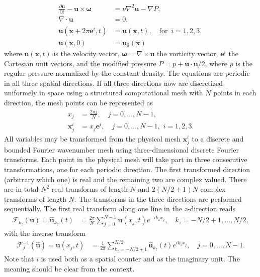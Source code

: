 \documentclass[11pt, oneside]{article}
\begin{document}
\begin{align}
 \frac{\partial \bm{u}}{\partial t} - \bm{u} \times \bm{\omega}   &= \nu \nabla^2 \bm{u} - \nabla{P}, \label{eq:NS} \\
 \nabla \cdot \bm{u} &= 0, \\
 \bm{u}(\bm{x}+2\pi \bm{e}^i, t) &= \bm{u}(\bm{x}, t), \quad \text{for }\, i=1,2,3,\\
 \bm{u}(\bm{x}, 0) &= \bm{u}_0(\bm{x})
\end{align}
where $\bm{u}(\bm{x}, t)$ is the velocity vector, $\bm{\omega}=\nabla \times \bm{u}$ the vorticity vector, $\bm{e}^i$ the Cartesian unit vectors, and the modified pressure $P=p+\bm{u}\cdot \bm{u}/2$, where $p$ is the regular pressure normalized by the constant density. The equations are periodic in all three spatial directions. If all three directions now are discretized uniformely in space using a structured computational mesh with $N$ points in each direction, the mesh points can be represented as
\begin{align}
{x}_j &= \frac{2\pi j}{N}, \quad j=0,\ldots, N-1,\\
\bm{x}^i_j &= x_j\bm{e}^i, \quad j=0,\ldots, N-1, \,\,i=1,2,3.
\label{eq:realmesh}
\end{align}
All variables may be transformed from the physical mesh $\bm{x}^i_j$ to a discrete and bounded Fourier wavenumber mesh using three-dimensional discrete Fourier transforms. Each point in the physical mesh will take part in three consecutive transformations, one for each periodic direction. The first transformed direction (arbitrary which one) is real and the remaining two are complex valued. There are in total $N^2$ real transforms of length $N$ and $2(N/2+1)N$ complex transforms of length $N$. The transforms in the three directions are performed sequentially. The first real transform along one line in the $z$-direction reads
\begin{align}
\mathcal{F}_{k_z}(\bm{u}) = \hat{\bm{u}}_{k_z}(t) &= \frac{2\pi}{N}\sum_{j=0}^{N-1}{\bm{u}({x}_j, t)}e^{-i k_z x_j}, \quad k_z=-N/2+1, \ldots, N/2,
\end{align}
with the inverse transform
\begin{align}
\mathcal{F}^{-1}_{j} (\hat{\bm{u}}) =\bm{u}(x_j, t) &= \frac{1}{2\pi}\sum_{k_z=-N/2+1}^{N/2}\hat{\bm{u}}_{k_z}(t)e^{i k_z {x}_j}, \quad j=0, \ldots, N-1.
\end{align}
Note that $i$ is used both as a spatial counter and as the imaginary unit. The
meaning should be clear from the context.
\end{document}
